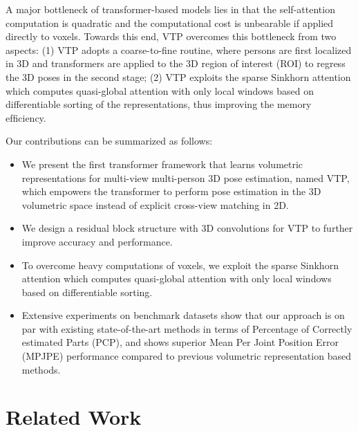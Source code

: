 \documentclass[lettersize,journal]{IEEEtran}
\begin{document}
A major bottleneck of transformer-based models lies in that the self-attention computation is quadratic and the computational cost is unbearable if applied directly to voxels. Towards this end, VTP overcomes this bottleneck from two aspects: (1) VTP adopts a coarse-to-fine routine, where persons are first localized in 3D and transformers are applied to the 3D region of interest (ROI) to regress the 3D poses in the second stage; (2) VTP exploits the sparse Sinkhorn attention which computes quasi-global attention with only local windows based on differentiable sorting of the representations, thus improving the memory efﬁciency. 

Our contributions can be summarized as follows:
\vspace{0.25cm}
\begin{itemize}

\item We present the first transformer framework that learns volumetric representations for multi-view multi-person 3D pose estimation, named VTP, which empowers the transformer to perform pose estimation in the 3D volumetric space instead of explicit cross-view matching in 2D.

\item We design a residual block structure with 3D convolutions for VTP to further improve accuracy and performance. 

\item To overcome heavy computations of voxels, we exploit the sparse Sinkhorn attention which computes quasi-global attention with only local windows based on differentiable sorting.

\item Extensive experiments on benchmark datasets show that our approach is on par with existing state-of-the-art methods in terms of Percentage of Correctly estimated Parts (PCP), and shows superior Mean Per Joint Position Error (MPJPE) performance compared to previous volumetric representation based methods.

\end{itemize}

\section{Related Work}
\end{document}
